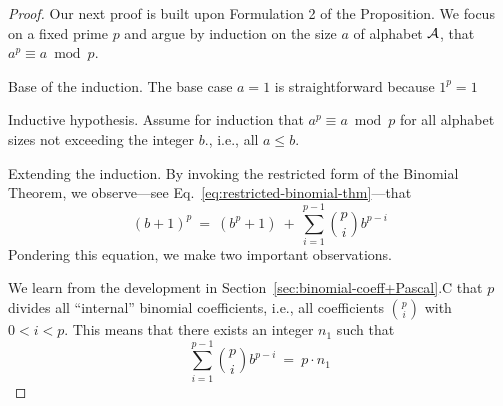 \begin{proof}
Our next proof is built upon Formulation 2 of the Proposition.  We focus on a fixed prime $p$ and argue by induction on the size $a$ of alphabet $\mbox{$\cal A$}$, that $a^{p} \equiv a \bmod p$.

\medskip

\noindent
{\sf Base of the induction.}
The base case $a=1$ is straightforward because $1^{p} = 1$

\medskip

\noindent
{\sf Inductive hypothesis.}
Assume for induction that $a^{p} \equiv a \bmod p$ for all alphabet sizes not exceeding the integer $b$., i.e., all $a \leq b$.

\medskip

\noindent
{\sf Extending the induction.}
By invoking the restricted form of the Binomial Theorem, we observe---see Eq.~\ref{eq:restricted-binomial-thm}---that
\begin{equation}
\label{eq:FLT-0}
(b+1)^p \ = \ \left( b^p + 1 \right) \ + \ \sum_{i=1}^{p-1} {p \choose i} b^{p-i}
\end{equation}
Pondering this equation, we make two important observations.

\medskip

We learn from the development in Section~\ref{sec:binomial-coeff+Pascal}.C that $p$ divides all
``internal'' binomial coefficients, i.e., all coefficients $\displaystyle {p \choose i}$ with $0 < i < p$.  This means that there exists an integer $n_1$ such that
\begin{equation}
\label{eq:FLT-1}
 \sum_{i=1}^{p-1} {p \choose i} b^{p-i} \ = \ p \cdot n_1
\end{equation}

\bigskip

\noindent {}

\bigskip


\end{proof}
